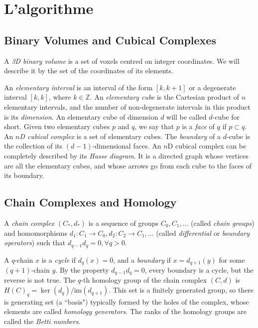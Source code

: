 \documentclass[10pt,a4paper]{report}
\begin{document}
\chapter{L'algorithme}

\section{Binary Volumes and Cubical Complexes}
A \emph{3D binary volume} is a set of voxels centred on integer coordinates. We will describe it by the set of the coordinates of its elements.

An \emph{elementary interval} is an interval of the form $\left[ k, k+1\right]$ or a degenerate interval $\left[ k, k \right]$, where $k \in \mathbb{Z}$. An \emph{elementary cube} is the Cartesian product of $n$ elementary intervals, and the number of non-degenerate intervals in this product is its \emph{dimension}. An elementary cube of dimension $d$ will be called $d$-cube for short. Given two elementary cubes $p$ and $q$, we say that $p$ is a \emph{face} of $q$ if $p \subset q$.
An \emph{$n$D cubical complex} is a set of elementary cubes. The \emph{boundary} of a $d$-cube is the collection of its $(d-1)$-dimensional faces. 
An $n$D cubical complex can be completely described by its \emph{Hasse diagram}. It is a directed graph whose vertices are all the elementary cubes, and whose arrows go from each cube to the faces of its boundary.


\section{Chain Complexes and Homology}
A \emph{chain complex} $(C_*, d_*)$ is a sequence of groups $C_0, C_1, \ldots$ (called \emph{chain groups}) and homomorphisms $d_1 : C_1 \rightarrow C_0, d_2 : C_2 \rightarrow C_1, \ldots$ (called \emph{differential} or \emph{boundary operators}) such that $d_{q-1} d_q = 0,  \forall q > 0$.

A $q$-chain $x$ is a \emph{cycle} if $d_q(x) = 0$, and a \emph{boundary} if $x = d_{q+1}(y)$ for some $(q+1)$-chain $y$. By the property $d_{q-1} d_q = 0$, every boundary is a cycle, but the reverse is not true. The $q$-th homology group of the chain complex $(C, d)$ is $H(C)_q = \ker(d_q) / \mathrm{im}(d_{q+1})$. This set is a finitely generated group, so there is generating set (a ``basis") typically formed by the holes of the complex, whose elements are called \emph{homology generators}. The ranks of the homology groups are called the \emph{Betti numbers}.
\end{document}
